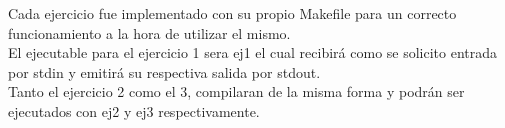 Cada ejercicio fue implementado con su propio Makefile para un correcto funcionamiento a la hora de utilizar el mismo.\\
El ejecutable para el ejercicio 1 sera ej1 el cual recibir\'a como se solicito entrada por stdin y emitir\'a su respectiva salida por stdout.\\
Tanto el ejercicio 2 como el 3, compilaran de la misma forma y podr\'an ser ejecutados con ej2 y ej3 respectivamente.\\